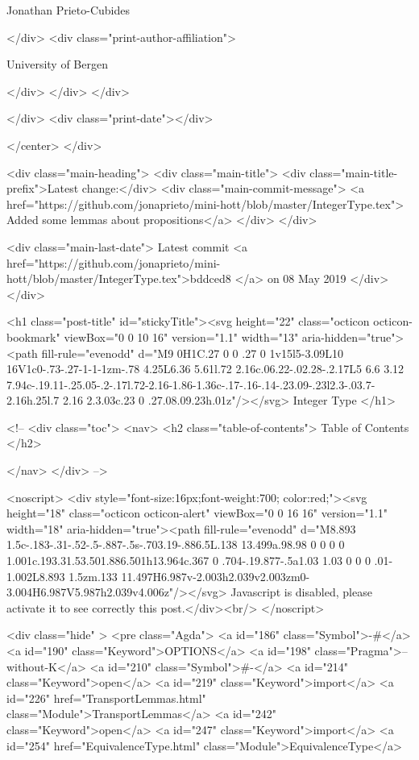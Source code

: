                   Jonathan Prieto-Cubides
                
              </div>
              <div class="print-author-affiliation">
                
                  University of Bergen
                
                </div>
            </div>
          </div>
          
          
        </div>
        <div class="print-date"></div>
        
        
    </center>
  </div>

  
  <div class="main-heading">
    <div class="main-title">
      <div class="main-title-prefix">Latest change:</div>
      <div class="main-commit-message">
            <a href="https://github.com/jonaprieto/mini-hott/blob/master/IntegerType.tex">
              Added some lemmas about propositions</a>
      </div>
    </div>

    <div class="main-last-date">
      Latest commit <a href="https://github.com/jonaprieto/mini-hott/blob/master/IntegerType.tex">bddced8 </a> on  08 May 2019
    </div>
  </div>
  
  <h1 class="post-title" id="stickyTitle"><svg height="22" class="octicon octicon-bookmark" viewBox="0 0 10 16" version="1.1" width="13" aria-hidden="true"><path fill-rule="evenodd" d="M9 0H1C.27 0 0 .27 0 1v15l5-3.09L10 16V1c0-.73-.27-1-1-1zm-.78 4.25L6.36 5.61l.72 2.16c.06.22-.02.28-.2.17L5 6.6 3.12 7.94c-.19.11-.25.05-.2-.17l.72-2.16-1.86-1.36c-.17-.16-.14-.23.09-.23l2.3-.03.7-2.16h.25l.7 2.16 2.3.03c.23 0 .27.08.09.23h.01z"/></svg> Integer Type
  </h1>

  <!-- 
  <div class="toc">
    <nav>
    <h2 class="table-of-contents"> Table of Contents </h2>
      

    </nav>
  </div>
   -->

  <noscript>
  <div style="font-size:16px;font-weight:700; color:red;"><svg height="18" class="octicon octicon-alert" viewBox="0 0 16 16" version="1.1" width="18" aria-hidden="true"><path fill-rule="evenodd" d="M8.893 1.5c-.183-.31-.52-.5-.887-.5s-.703.19-.886.5L.138 13.499a.98.98 0 0 0 0 1.001c.193.31.53.501.886.501h13.964c.367 0 .704-.19.877-.5a1.03 1.03 0 0 0 .01-1.002L8.893 1.5zm.133 11.497H6.987v-2.003h2.039v2.003zm0-3.004H6.987V5.987h2.039v4.006z"/></svg> Javascript is disabled, please activate it to see correctly this post.</div><br/>
  </noscript>

  <div class="hide" >
<pre class="Agda">
<a id="186" class="Symbol">{-#</a> <a id="190" class="Keyword">OPTIONS</a> <a id="198" class="Pragma">--without-K</a> <a id="210" class="Symbol">#-}</a>
<a id="214" class="Keyword">open</a> <a id="219" class="Keyword">import</a> <a id="226" href="TransportLemmas.html" class="Module">TransportLemmas</a>
<a id="242" class="Keyword">open</a> <a id="247" class="Keyword">import</a> <a id="254" href="EquivalenceType.html" class="Module">EquivalenceType</a>

